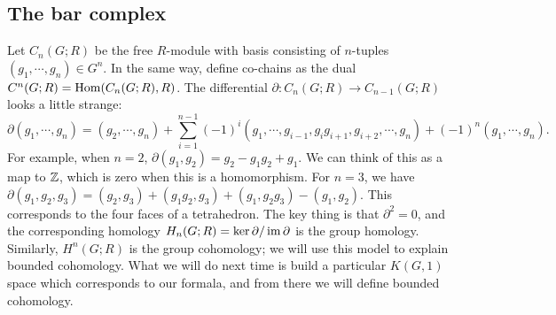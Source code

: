 \subsection{The bar complex}
Let $C_n (G;R)$ be the free $R$-module with basis consisting of $n$-tuples $(g_1, \cdots ,g_n)  \in G ^n $. In the same way, define co-chains as the dual $C^n (G;R)=\operatorname{Hom}(C_n (G;R),R)$. The differential $\partial  \colon C_n (G;R) \to C_{n-1}(G;R)$ looks a little strange: \[
    \partial (g_1,\cdots ,g_n )= (g_2,\cdots ,g_n )+\sum_{i=1}^{n-1} (-1)^i (g_1, \cdots ,g_{i-1},g_i g_{i+1},g_{i+2},\cdots ,g_n )+(-1)^n (g_1,\cdots ,g_n ).
\] For example, when $n=2$, $\partial (g_1,g_2)=g_2-g_1g_2+g_1$. We can think of this as a map to $\mathbb{Z}$, which is zero when this is a homomorphism. For $n=3$, we have $\partial (g_1,g_2,g_3)=(g_2,g_3)+(g_1g_2,g_3)+(g_1,g_2g_3)-(g_1,g_2)$. This corresponds to the four faces of a tetrahedron. The key thing is that $\partial ^2=0$, and the corresponding homology $H_n (G;R) = \ker \partial  / \operatorname{im} \partial $ is the group homology. Similarly, $H^n (G;R)$ is the group cohomology; we will use this model to explain bounded cohomology. What we will do next time is build a particular $K(G,1)$ space which corresponds to our formala, and from there we will define bounded cohomology.


